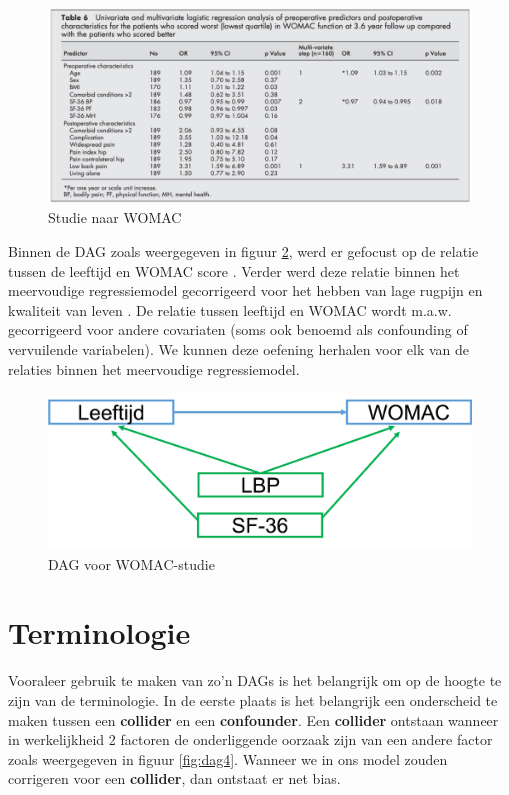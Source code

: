 \documentclass[
]{book}
\theoremstyle{definition}
\theoremstyle{definition}
\theoremstyle{definition}
\theoremstyle{definition}
\theoremstyle{remark}
\begin{document}
\begin{figure}
\includegraphics[width=0.75\linewidth]{img/dag3} \caption{Studie naar WOMAC}\label{fig:dag3}
\end{figure}

Binnen de DAG zoals weergegeven in figuur \ref{fig:dag2}, werd er gefocust op de relatie tussen { de leeftijd en WOMAC score }. Verder werd deze relatie binnen het meervoudige regressiemodel gecorrigeerd voor { het hebben van lage rugpijn } en { kwaliteit van leven }. De relatie tussen leeftijd en WOMAC wordt m.a.w. gecorrigeerd voor andere covariaten (soms ook benoemd als confounding of vervuilende variabelen). We kunnen deze oefening herhalen voor elk van de relaties binnen het meervoudige regressiemodel.

\begin{figure}
\includegraphics[width=0.75\linewidth]{img/dag2} \caption{DAG voor WOMAC-studie}\label{fig:dag2}
\end{figure}

\hypertarget{terminologie}{%
\section*{Terminologie}\label{terminologie}}


Vooraleer gebruik te maken van zo'n DAGs is het belangrijk om op de hoogte te zijn van de terminologie. In de eerste plaats is het belangrijk een onderscheid te maken tussen een \textbf{collider} en een \textbf{confounder}. Een \textbf{collider} ontstaan wanneer in werkelijkheid 2 factoren de onderliggende oorzaak zijn van een andere factor zoals weergegeven in figuur \ref{fig:dag4}. Wanneer we in ons model zouden corrigeren voor een \textbf{collider}, dan ontstaat er net bias.
\end{document}
